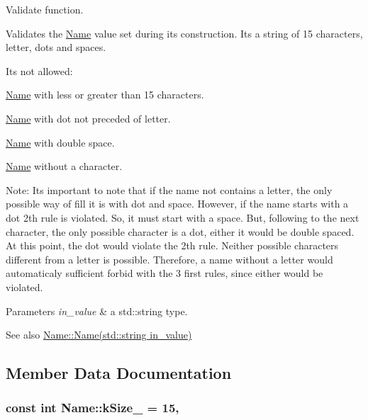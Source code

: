 Validate function. 

Validates the \hyperlink{className}{Name} value set during its construction. It\textquotesingle{}s a string of 15 characters, letter, dots and spaces.

It\textquotesingle{}s not allowed\+:


\begin{DoxyItemize}
\item \hyperlink{className}{Name} with less or greater than 15 characters.
\item \hyperlink{className}{Name} with dot not preceded of letter.
\item \hyperlink{className}{Name} with double space.
\item \hyperlink{className}{Name} without a character.
\end{DoxyItemize}

Note\+: It\textquotesingle{}s important to note that if the name not contains a letter, the only possible way of fill it is with dot and space. However, if the name starts with a dot 2th rule is violated. So, it must start with a space. But, following to the next character, the only possible character is a dot, either it would be double spaced. At this point, the dot would violate the 2th rule. Neither possible characters different from a letter is possible. Therefore, a name without a letter would automaticaly sufficient forbid with the 3 first rules, since either would be violated.


\begin{DoxyParams}{Parameters}
{\em in\+\_\+value} & a std\+::string type.\\
\hline
\end{DoxyParams}
\begin{DoxySeeAlso}{See also}
\hyperlink{className_acc3c134ac7f5884a8b9d04ed0dd86a42}{Name\+::\+Name(std\+::string in\+\_\+value)} 
\end{DoxySeeAlso}


\subsection{Member Data Documentation}
\subsubsection[{\texorpdfstring{k\+Size\+\_\+}{kSize_}}]{\setlength{\rightskip}{0pt plus 5cm}const int Name\+::k\+Size\+\_\+ = 15\hspace{0.3cm}{\ttfamily [static]}, {\ttfamily [private]}}\hypertarget{className_addb4db7f2c0569028917ec65014c764f}{}\label{className_addb4db7f2c0569028917ec65014c764f}


